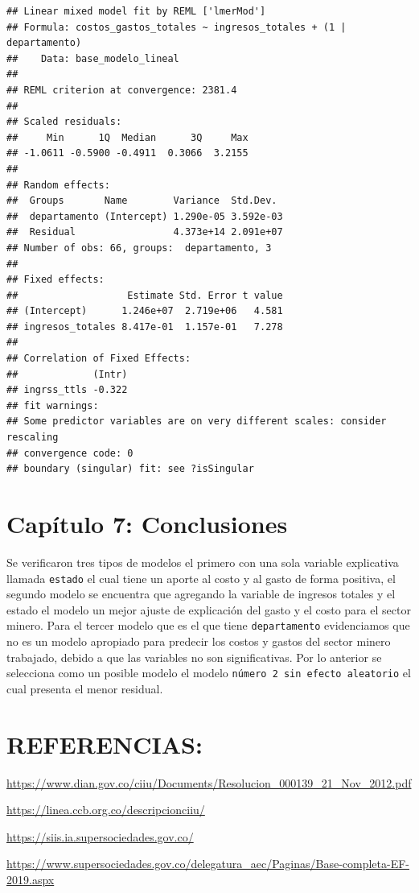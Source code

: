 \documentclass[
  11pt,
]{article}
\begin{document}
\begin{verbatim}
## Linear mixed model fit by REML ['lmerMod']
## Formula: costos_gastos_totales ~ ingresos_totales + (1 | departamento)
##    Data: base_modelo_lineal
## 
## REML criterion at convergence: 2381.4
## 
## Scaled residuals: 
##     Min      1Q  Median      3Q     Max 
## -1.0611 -0.5900 -0.4911  0.3066  3.2155 
## 
## Random effects:
##  Groups       Name        Variance  Std.Dev. 
##  departamento (Intercept) 1.290e-05 3.592e-03
##  Residual                 4.373e+14 2.091e+07
## Number of obs: 66, groups:  departamento, 3
## 
## Fixed effects:
##                   Estimate Std. Error t value
## (Intercept)      1.246e+07  2.719e+06   4.581
## ingresos_totales 8.417e-01  1.157e-01   7.278
## 
## Correlation of Fixed Effects:
##             (Intr)
## ingrss_ttls -0.322
## fit warnings:
## Some predictor variables are on very different scales: consider rescaling
## convergence code: 0
## boundary (singular) fit: see ?isSingular
\end{verbatim}

\hypertarget{capuxedtulo-7-conclusiones}{%
\section{Capítulo 7: Conclusiones}\label{capuxedtulo-7-conclusiones}}

Se verificaron tres tipos de modelos el primero con una sola variable
explicativa llamada \texttt{estado} el cual tiene un aporte al costo y
al gasto de forma positiva, el segundo modelo se encuentra que agregando
la variable de ingresos totales y el estado el modelo un mejor ajuste de
explicación del gasto y el costo para el sector minero. Para el tercer
modelo que es el que tiene \texttt{departamento} evidenciamos que no es
un modelo apropiado para predecir los costos y gastos del sector minero
trabajado, debido a que las variables no son significativas. Por lo
anterior se selecciona como un posible modelo el modelo
\texttt{número\ 2\ sin\ efecto\ aleatorio} el cual presenta el menor
residual.

\hypertarget{referencias}{%
\section{REFERENCIAS:}\label{referencias}}

\url{https://www.dian.gov.co/ciiu/Documents/Resolucion_000139_21_Nov_2012.pdf}

\url{https://linea.ccb.org.co/descripcionciiu/}

\url{https://siis.ia.supersociedades.gov.co/}

\url{https://www.supersociedades.gov.co/delegatura_aec/Paginas/Base-completa-EF-2019.aspx}
\end{document}
